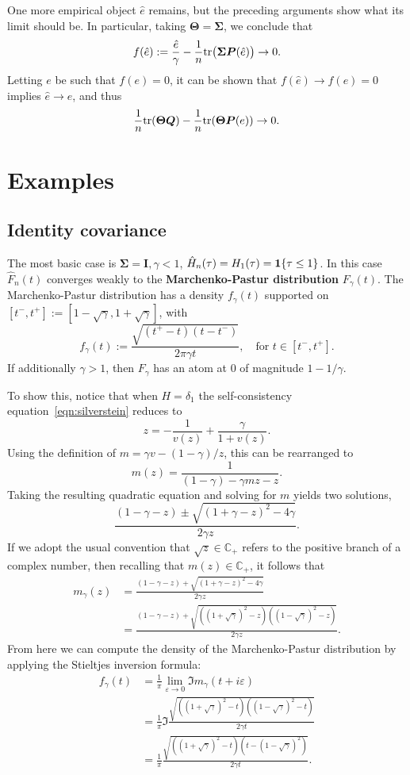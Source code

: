 \documentclass{article}
\newcommand{\bSigma}{\boldsymbol{\Sigma}}
\newcommand{\bTheta}{\boldsymbol{\Theta}}
\newcommand{\bQ}{\boldsymbol{Q}}
\newcommand{\bP}{\boldsymbol{P}}
\newcommand{\bI}{\boldsymbol{I}}
\begin{document}
One more empirical object $\hat{e}$ remains, but the preceding arguments show what its limit should be. In particular, taking $\bTheta = \bSigma$, we conclude that
$$
f(\hat{e}) := \frac{\hat{e}}{\gamma} - \frac{1}{n}\tr\big(\bSigma \bP(\hat{e})\big) \to 0.
$$
Letting $e$ be such that $f(e) = 0$, it can be shown that $f(\hat{e}) \to f(e) = 0$ implies $\hat{e} \to e$, and thus
\begin{equation}
	\frac{1}{n}\tr(\bTheta \bQ) - \frac{1}{n}\tr(\bTheta \bP(e)) \to 0.
\end{equation}


\section{Examples}

\subsection{Identity covariance}

The most basic case is $\bSigma = \bI, \gamma < 1$, $\hat{H}_n(\tau) = H_1(\tau) = \mathbf{1}\{\tau \leq 1\}$. In this case $\hat{F}_n(t)$ converges weakly to the {\bf Marchenko-Pastur distribution} $F_{\gamma}(t)$. The Marchenko-Pastur distribution has a density $f_{\gamma}(t)$ supported on $[t^{-},t^{+}] := [1 - \sqrt{\gamma}, 1 + \sqrt{\gamma}]$, with 
$$
f_{\gamma}(t) := \frac{\sqrt{(t^{+} - t)(t - t^{-})}}{2 \pi \gamma t}, \quad \textrm{for $t \in [t^{-},t^{+}]$.}
$$
If additionally $\gamma > 1$, then $F_{\gamma}$ has an atom at $0$ of magnitude $1 - 1/\gamma$. 

To show this, notice that when $H = \delta_1$ the self-consistency equation~\eqref{eqn:silverstein} reduces to
$$
z = -\frac{1}{v(z)} + \frac{\gamma}{1 + v(z)}.
$$
Using the definition of $m = \gamma v - (1 - \gamma)/z$, this can be rearranged to 
$$
m(z)= \frac{1}{(1 - \gamma) - \gamma m z - z}.
$$
Taking the resulting quadratic equation and solving for $m$ yields two solutions, 
$$
\frac{(1 - \gamma - z) \pm \sqrt{(1 + \gamma - z)^2 - 4 \gamma}}{2 \gamma z}.
$$
If we adopt the usual convention that $\sqrt{z} \in \mathbb{C}_{+}$ refers to the positive branch of a complex number, then recalling that $m(z) \in \mathbb{C}_{+}$, it follows that 
\begin{align*}
m_{\gamma}(z) 
& = \frac{(1 - \gamma - z) + \sqrt{(1 + \gamma - z)^2 - 4 \gamma}}{2 \gamma z} \\
& = \frac{(1 - \gamma - z) + \sqrt{( (1 + \sqrt{\gamma})^2 - z)((1 - \sqrt{\gamma})^2 - z)}}{2 \gamma z}.
\end{align*}
From here we can compute the density of the Marchenko-Pastur distribution by applying the Stieltjes inversion formula:
\begin{align*}
f_{\gamma}(t) 
& = \frac{1}{\pi}\lim_{\varepsilon \to 0} \Im m_{\gamma}(t + i \varepsilon) \\
& = \frac{1}{\pi} \Im \frac{\sqrt{( (1 + \sqrt{\gamma})^2 - t)((1 - \sqrt{\gamma})^2 - t)}}{2 \gamma t} \\
& = \frac{1}{\pi} \frac{\sqrt{( (1 + \sqrt{\gamma})^2 - t)(t - (1 - \sqrt{\gamma})^2)}}{2 \gamma t}.
\end{align*}

	
	
\end{document}

